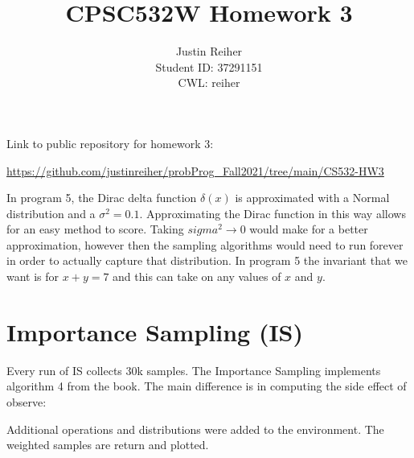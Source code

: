 \documentclass[]{article}
\title{CPSC532W Homework 3}
\author{Justin Reiher\\ Student ID: 37291151\\ CWL: reiher}
\date{}
\begin{document}
\maketitle

Link to public repository for homework 3:
\begin{center}
	\url{https://github.com/justinreiher/probProg_Fall2021/tree/main/CS532-HW3}
\end{center}
In program 5, the Dirac delta function $\delta(x)$ is approximated with a Normal distribution and a $\sigma^2 = 0.1$. Approximating the Dirac function in this way allows for an easy method to score. Taking $sigma^2 \rightarrow 0$ would make for a better approximation, however then the sampling algorithms would need to run forever in order to actually capture that distribution. In program 5 the invariant that we want is for $x + y = 7$ and this can take on any values of $x$ and $y$.
\section{Importance Sampling (IS)}
Every run of IS collects 30k samples. The Importance Sampling implements algorithm 4 from the book. The main difference is in computing the side effect of observe:

Additional operations and distributions were added to the environment. The weighted samples are return and plotted.  
\end{document}
